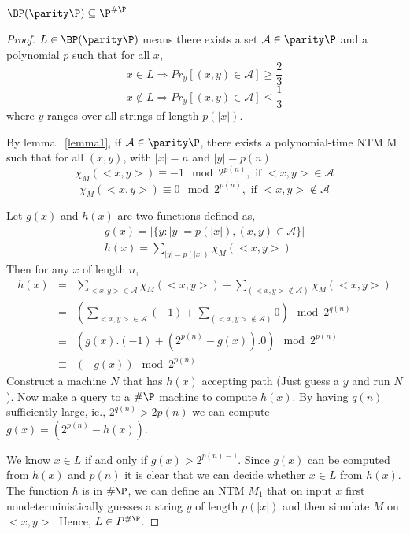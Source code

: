 \documentclass[11pt]{article}
\begin{document}
\begin{theorem} $\BP(\parity\P)\subseteq \P^{\#\P}$
\end{theorem}
\begin{proof} $L\in \BP(\parity\P)$ means there exists a set
$\mathcal{A} \in \parity\P$ and a polynomial $p$ such that for all
$x$,
$$x\in L \Rightarrow Pr_y[(x,y)\in \mathcal{A}]\geq \frac{2}{3}$$
$$x\notin L \Rightarrow Pr_y[(x,y)\in \mathcal{A}]\leq \frac{1}{3}$$
where $y$ ranges over all strings of length $p(|x|)$.

By lemma ~\ref{lemma1}, if $\mathcal{A} \in \parity\P$, there exists a
polynomial-time NTM M such that for all $(x,y)$, with $|x|=n$ and
$|y|=p(n)$
$$\chi_M(<x,y>)\equiv -1\mod 2^{p(n)}, \mbox{ if } <x,y>\in\mathcal{A}$$
$$\chi_M(<x,y>)\equiv 0\mod 2^{p(n)}, \mbox{ if } <x,y>\notin\mathcal{A}$$


Let $g(x)$ and $h(x)$ are two functions defined as,
\begin{eqnarray*} g(x)=|\{y:|y|=p(|x|),(x,y)\in \mathcal{A}\}|\\
h(x)=\displaystyle\sum_{|y|=p(|x|)}\chi_M(<x,y>)
\end{eqnarray*} Then for any $x$ of length $n$,
\begin{eqnarray*}
h(x)&=&\displaystyle\sum_{<x,y>\in\mathcal{A}}\chi_M(<x,y>)+\displaystyle\sum_{(<x,y>\notin\mathcal{A})}\chi_M(<x,y>)\\
&=&(\displaystyle\sum_{<x,y>\in\mathcal{A}}(-1)+\displaystyle\sum_{(<x,y>\notin\mathcal{A})}0)\mod
2^{q(n)}\\ %
&\equiv&(g(x).(-1)+(2^{p(n)}-g(x)).0)\mod 2^{p(n)}\\
&\equiv&(-g(x))\mod 2^{p(n)}
\end{eqnarray*} Construct a machine $N$ that has $h(x)$ accepting path
(Just guess a $y$ and run $N$). Now make a query to a $\#\P$ machine
to compute $h(x)$. By having $q(n)$ sufficiently large, ie.,
$2^{q(n)}>2{p(n)}$ we can compute $g(x)=(2^{p(n)}-h(x))$.

We know $x\in L$ if and only if $g(x)>2^{p(n)-1}$. Since $g(x)$ can be
computed from $h(x)$ and $p(n)$ it is clear that we can decide whether
$x\in L$ from $h(x)$. The function $h$ is in $\#\P$, we can define an
NTM $M_1$ that on input $x$ first nondeterministically guesses a
string $y$ of length $p(|x|)$ and then simulate $M$ on $<x,y>$.
Hence, $L\in P^{\#\P}$.
\end{proof}
\end{document}
